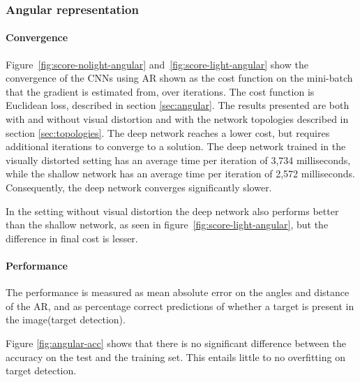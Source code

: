 

\subsubsection{Angular representation}
\paragraph{Convergence}
Figure~\ref{fig:score-nolight-angular} and~\ref{fig:score-light-angular} show the convergence of the CNNs using AR shown as the cost function on the mini-batch that the gradient is estimated from, over iterations. The cost function is Euclidean loss, described in section \ref{sec:angular}.
The results presented are both with and without visual distortion and with the network topologies described in section \ref{sec:topologies}. The deep network reaches a lower cost, but requires additional iterations to converge to a solution. The deep network trained in the visually distorted setting has an average time per iteration of 3,734 milliseconds, while the shallow network has an average time per iteration of 2,572 milliseconds. Consequently, the deep network converges significantly slower.

In the setting without visual distortion the deep network also performs better than the shallow network, as seen in figure~\ref{fig:score-light-angular}, but the difference in final cost is lesser.%





\paragraph{Performance}
\label{sec:results-angular-representation}
The performance is measured as mean absolute error on the angles and distance of the AR, and as percentage correct predictions of whether a target is present in the image(target detection).

Figure \ref{fig:angular-acc} shows that there is no significant difference between the accuracy on the test and the training set. This entails little to no overfitting on target detection.

